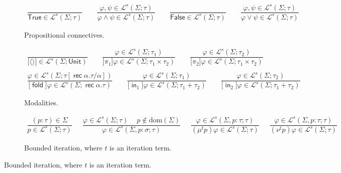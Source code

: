 \documentclass[%
  a4paper,
  UKenglish,
  cleveref,
  autoref,
  thm-restate,
  numberwithinsect,
]{lipics-v2021}
\newcommand\pair[1]{{\langle #1\rangle}}
\newcommand\dom{\mathrm{dom}}
\newcommand\temp[1]{\mathsf{#1}}
\newcommand\True{\temp{True}}
\newcommand\False{\temp{False}}
\newcommand\term[1]{\mathsf{#1}}
\newcommand\type[1]{\term{#1}}
\newcommand\inj{\mathop{\term{in}}}
\newcommand\fold{\mathop{\term{fold}}}
\newcommand\Unit{\type{Unit}}
\newcommand\rec{\mathop{\type{rec}}}	%
\newcommand\TV{\alpha}		%
\newcommand\PT{\tau}		%
\newcommand\PTbis{\sigma}	%
\newcommand\FP{p}
\newcommand\FPEnv{\Sigma}
\newcommand\finmu{\mu}
\newcommand\finnu{\nu}
\newcommand\Lang{\mathcal{L}}
\newcommand\form[1]{\lbrack #1 \rbrack}
\newcommand\sign{s}
\begin{document}
\begin{figure}[t!]
\begin{subfigure}{\textwidth}
\centering
\(
\begin{array}{c}
%
\dfrac{}
  {\True \in \Lang^\sign(\FPEnv; \PT)}
%
\qquad
%
\dfrac{\varphi,\psi \in \Lang^\sign(\FPEnv; \PT)}
  {\varphi \land \psi \in \Lang^\sign(\FPEnv; \PT)}
%
\qquad
%
\dfrac{}
  {\False \in \Lang^\sign(\FPEnv; \PT)}
%
\qquad
%
\dfrac{\varphi,\psi \in \Lang^\sign(\FPEnv; \PT)}
  {\varphi \lor \psi \in \Lang^\sign(\FPEnv; \PT)}
%
\end{array}
\)
\caption{Propositional connectives.%
\label{fig:form:prop}}
\end{subfigure}


\begin{subfigure}{\textwidth}
\centering
\(
\begin{array}{c}
%
\dfrac{}
  {\form{\pair{}} \in \Lang^\sign(\FPEnv; \Unit)}
%
\qquad
%
\dfrac{\varphi \in \Lang^\sign(\FPEnv; \PT_1)}
  {\form{\pi_1}\varphi \in \Lang^\sign(\FPEnv; \PT_1 \times \PT_2)}
%
\qquad
%
\dfrac{\varphi \in \Lang^\sign(\FPEnv; \PT_2)}
  {\form{\pi_2}\varphi \in \Lang^\sign(\FPEnv; \PT_1 \times \PT_2)}
%
\\\\
%
\dfrac{\varphi \in \Lang^\sign(\FPEnv; \PT[\rec \TV.\PT/\TV])}
  {\form\fold \varphi \in \Lang^\sign(\FPEnv; \rec \TV.\PT)}
%
\qquad
%
\dfrac{\varphi \in \Lang^\sign(\FPEnv; \PT_1)}
  {\form{\inj_1}\varphi \in \Lang^\sign(\FPEnv; \PT_1 + \PT_2)}
%
\qquad
%
\dfrac{\varphi \in \Lang^\sign(\FPEnv; \PT_2)}
  {\form{\inj_2}\varphi \in \Lang^\sign(\FPEnv; \PT_1 + \PT_2)}
%
\end{array}
\)
\caption{Modalities.%
\label{fig:form:mod}}
\end{subfigure}


\begin{subfigure}{\textwidth}
\centering
\(
\begin{array}{c}
%
\dfrac{(\FP \colon \PT) \in \FPEnv}
  {\FP \in \Lang^\sign(\FPEnv; \PT)}  
%
\quad~~
%
\dfrac{\varphi \in \Lang^\sign(\FPEnv;\PT)
  \quad~
  \FP \notin \dom(\FPEnv)}
  {\varphi \in \Lang^\sign(\FPEnv, \FP \colon \PTbis; \PT)}
%
\quad~~
%
\dfrac{\varphi \in \Lang^\sign(\FPEnv, \FP\colon\PT; \PT)}
  {(\finmu^t \FP)\varphi \in \Lang^\sign(\FPEnv; \PT)}
%
\quad~~
%
\dfrac{\varphi \in \Lang^\sign(\FPEnv, \FP\colon \PT; \PT)}
  {(\finnu^t \FP)\varphi \in \Lang^\sign(\FPEnv; \PT)}
\end{array}
\)
\caption{Bounded iteration, where $t$ is an iteration term.%
\label{fig:form:iter}}
\end{subfigure}



\end{figure}
\end{document}
